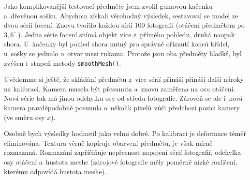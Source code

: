 \documentclass[12pt]{report}			%
\begin{document}
                Jako komplikovanější testovací předměty jsem zvolil gumovou kačenku a~dřevěnou sošku. Abychom získali věrohodný výsledek, sestavoval se model ze dvou sérií focení. Znovu tvořilo každou sírii 100 fotografií (otáčení předmětem po $3,6^\circ$.). Jedna série focení snímá objekt více z~přímého pohledu, druhá naopak shora. U~kačenky byl pohled shora nutný pro správné oříznutí konců křídel, u~sošky se jednalo o~otvor mezi rukama. Protože jsou oba předměty hladké, byl zvýšen i~stupeň metody \verb|smoothMesh()|.

                Uvědomme si ještě, že skládání předmětu z~více sérií přináší přináší další nároky na kalibraci. Kamera musela být přesunuta a~znovu zaměřena na osu otáčení. Nová série tak má jinou odchylku osy od středu fotografie. Zároveň se ale i~nová kamera pravděpodobně posunula o~několik pixelů vůči předchozí pozici kamery (ve směru osy $x$).

                Osobně bych výsledky hodnotil jako velmi dobré. Po kalibraci je deformace téměř eliminována. Textura věrně kopíruje obarvení předmětu, je však mírně rozmazaná. Rozmazání zapříčiňuje nepřesnost napojení sérií fotografií, odchylka osy otáčení a~hustota meshe (zdrojové fotografie měly poměrně nízké rozlišení, kterému odpovídá hustota meshe).
\end{document}

